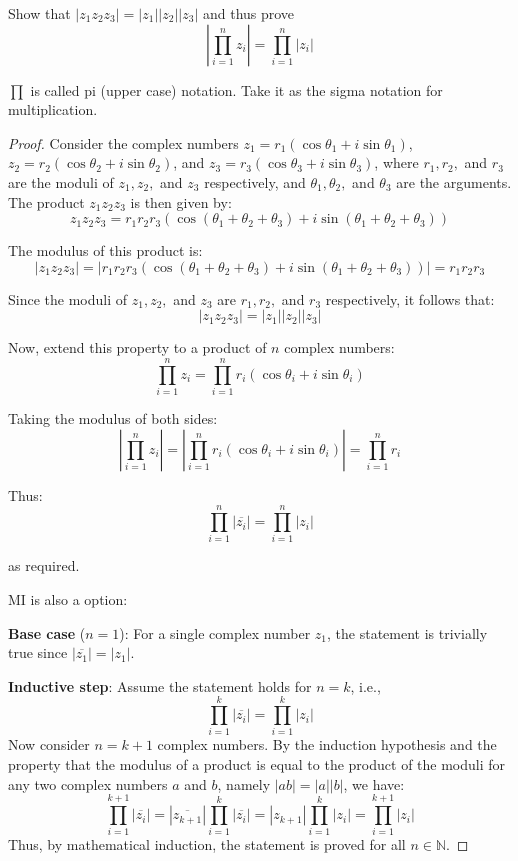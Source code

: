 \documentclass[
	12pt, %
	fleqn, %
	a4paper, %
]{LegrandOrangeBook}
\begin{document}
\begin{exercise}
    Show that $|z_1z_2z_3|=|z_1||z_2||z_3|$ and thus prove 
    $$|\prod_{i=1}^{n} z_i| = \prod_{i=1}^{n} |z_i|$$
    \begin{remark}
        $\prod$ is called pi (upper case) notation. Take it as the sigma notation for multiplication.
    \end{remark}
\end{exercise}
    \begin{proof}
        Consider the complex numbers \( z_1 = r_1(\cos \theta_1 + i\sin \theta_1) \), \( z_2 = r_2(\cos \theta_2 + i\sin \theta_2) \), and \( z_3 = r_3(\cos \theta_3 + i\sin \theta_3) \), where \( r_1, r_2, \) and \( r_3 \) are the moduli of \( z_1, z_2, \) and \( z_3 \) respectively, and \( \theta_1, \theta_2, \) and \( \theta_3 \) are the arguments. The product \( z_1z_2z_3 \) is then given by:
        \[
        z_1z_2z_3 = r_1r_2r_3(\cos(\theta_1 + \theta_2 + \theta_3) + i\sin(\theta_1 + \theta_2 + \theta_3))
        \]
        
        The modulus of this product is:
        \[
        |z_1z_2z_3| = |r_1r_2r_3(\cos(\theta_1 + \theta_2 + \theta_3) + i\sin(\theta_1 + \theta_2 + \theta_3))| = r_1r_2r_3
        \]
        
        Since the moduli of \( z_1, z_2, \) and \( z_3 \) are \( r_1, r_2, \) and \( r_3 \) respectively, it follows that:
        \[
        |z_1z_2z_3| = |z_1||z_2||z_3|
        \]
        
        Now, extend this property to a product of \( n \) complex numbers:
        \[
        \prod_{i=1}^{n} z_i = \prod_{i=1}^{n} r_i(\cos \theta_i + i\sin \theta_i)
        \]
        
        Taking the modulus of both sides:
        \[
        \left|\prod_{i=1}^{n} z_i\right| = \left|\prod_{i=1}^{n} r_i(\cos \theta_i + i\sin \theta_i)\right| = \prod_{i=1}^{n} r_i
        \]
        
        Thus:
        \[
        \prod_{i=1}^{n} |\overline{z_i}| = \prod_{i=1}^{n} |z_i|
        \]
        
        as required.

        MI is also a option:

        \textbf{Base case} (\(n = 1\)): For a single complex number \(z_1\), the statement is trivially true since \(|\overline{z_1}| = |z_1|\).

        \textbf{Inductive step}: Assume the statement holds for \(n = k\), i.e.,
        \[
        \prod_{i=1}^{k} |\overline{z_i}| = \prod_{i=1}^{k} |z_i|
        \]
        Now consider \(n = k + 1\) complex numbers. By the induction hypothesis and the property that the modulus of a product is equal to the product of the moduli for any two complex numbers \(a\) and \(b\), namely \(|ab| = |a||b|\), we have:
        \[
        \prod_{i=1}^{k+1} |\overline{z_i}| = |\overline{z_{k+1}}| \prod_{i=1}^{k} |\overline{z_i}| = |z_{k+1}| \prod_{i=1}^{k} |z_i| = \prod_{i=1}^{k+1} |z_i|
        \]
        Thus, by mathematical induction, the statement is proved for all \(n \in \mathbb{N}\).
        \end{proof}
\end{document}
